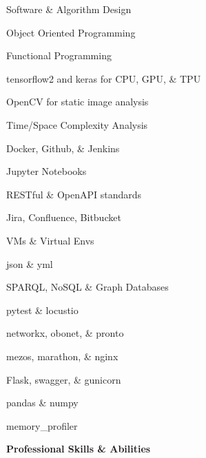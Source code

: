 \documentclass[letterpaper,final]{memoir}
\newcommand{\Sep}{\vspace{1.0em}}
\newcommand{\SmallSep}{\vspace{0.4em}}
\newcommand{\CVItem}[1]
	{\textbf{\color{Blue} #1}}
\begin{document}
\begin{multicols}{2}

    \begin{compactitem}[\color{Blue}$\circ$]

        \item Software \& Algorithm Design
        \SmallSep
        \item Object Oriented Programming
        \SmallSep
        \item Functional Programming
        \SmallSep
        \item tensorflow2 and keras for CPU, GPU, \& TPU
        \SmallSep
        \item OpenCV for static image analysis
        \SmallSep

        \item Time/Space Complexity Analysis
        \SmallSep

        \item Docker, Github, \& Jenkins
        \SmallSep
        \item Jupyter Notebooks
        \SmallSep
        \item RESTful \& OpenAPI standards
        \SmallSep
        \item Jira, Confluence, Bitbucket
		\SmallSep
        \item VMs \& Virtual Envs
        \SmallSep

        \item json \& yml
        \SmallSep
        \item SPARQL, NoSQL \& Graph Databases
        \SmallSep
        \item pytest \& locustio
        \SmallSep
        \item networkx, obonet, \& pronto
        \SmallSep
        \item mezos, marathon, \& nginx
        \SmallSep
        \item Flask, swagger, \& gunicorn
        \SmallSep

        \item pandas \& numpy
        \SmallSep
        \item memory\_profiler
        \SmallSep

    \end{compactitem}

\end{multicols}
\Sep

\CVItem{Professional Skills \& Abilities}
\Sep
\end{document}
